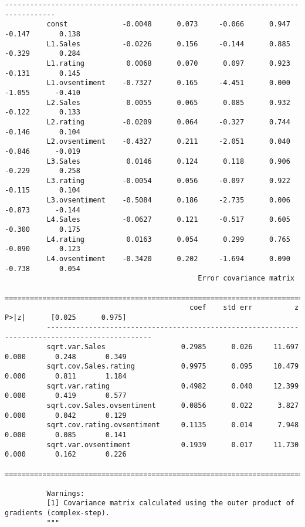 \documentclass[11pt]{article}
\begin{document}
\begin{Verbatim}[commandchars=\\\{\}]
          ----------------------------------------------------------------------------------
          const             -0.0048      0.073     -0.066      0.947      -0.147       0.138
          L1.Sales          -0.0226      0.156     -0.144      0.885      -0.329       0.284
          L1.rating          0.0068      0.070      0.097      0.923      -0.131       0.145
          L1.ovsentiment    -0.7327      0.165     -4.451      0.000      -1.055      -0.410
          L2.Sales           0.0055      0.065      0.085      0.932      -0.122       0.133
          L2.rating         -0.0209      0.064     -0.327      0.744      -0.146       0.104
          L2.ovsentiment    -0.4327      0.211     -2.051      0.040      -0.846      -0.019
          L3.Sales           0.0146      0.124      0.118      0.906      -0.229       0.258
          L3.rating         -0.0054      0.056     -0.097      0.922      -0.115       0.104
          L3.ovsentiment    -0.5084      0.186     -2.735      0.006      -0.873      -0.144
          L4.Sales          -0.0627      0.121     -0.517      0.605      -0.300       0.175
          L4.rating          0.0163      0.054      0.299      0.765      -0.090       0.123
          L4.ovsentiment    -0.3420      0.202     -1.694      0.090      -0.738       0.054
                                              Error covariance matrix                                    
          ===============================================================================================
                                            coef    std err          z      P>|z|      [0.025      0.975]
          -----------------------------------------------------------------------------------------------
          sqrt.var.Sales                  0.2985      0.026     11.697      0.000       0.248       0.349
          sqrt.cov.Sales.rating           0.9975      0.095     10.479      0.000       0.811       1.184
          sqrt.var.rating                 0.4982      0.040     12.399      0.000       0.419       0.577
          sqrt.cov.Sales.ovsentiment      0.0856      0.022      3.827      0.000       0.042       0.129
          sqrt.cov.rating.ovsentiment     0.1135      0.014      7.948      0.000       0.085       0.141
          sqrt.var.ovsentiment            0.1939      0.017     11.730      0.000       0.162       0.226
          ===============================================================================================
          
          Warnings:
          [1] Covariance matrix calculated using the outer product of gradients (complex-step).
          """
\end{Verbatim}
            
\end{document}
